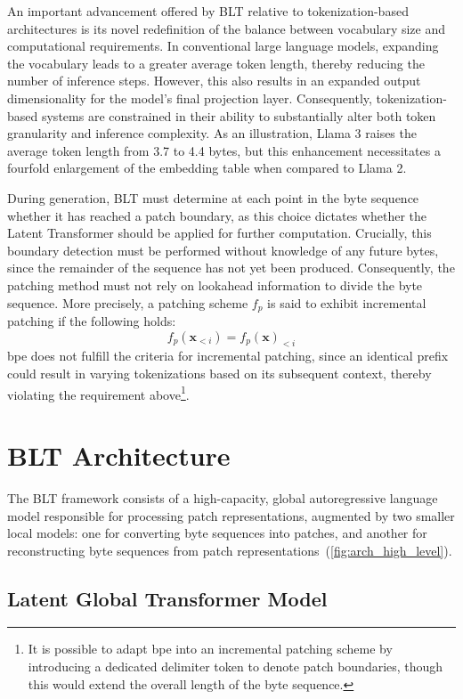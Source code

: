 An important advancement offered by {\textsc BLT} relative to tokenization-based architectures is its novel redefinition of the balance between vocabulary size and computational requirements. In conventional large language models, expanding the vocabulary leads to a greater average token length, thereby reducing the number of inference steps. However, this also results in an expanded output dimensionality for the model’s final projection layer. Consequently, tokenization-based systems are constrained in their ability to substantially alter both token granularity and inference complexity. As an illustration, Llama 3 raises the average token length from 3.7 to 4.4 bytes, but this enhancement necessitates a fourfold enlargement of the embedding table when compared to Llama 2.

During generation, {\textsc BLT} must determine at each point in the byte sequence whether it has reached a patch boundary, as this choice dictates whether the Latent Transformer should be applied for further computation. Crucially, this boundary detection must be performed without knowledge of any future bytes, since the remainder of the sequence has not yet been produced. Consequently, the patching method must not rely on lookahead information to divide the byte sequence. More precisely, a patching scheme $f_p$ is said to exhibit incremental patching if the following holds:
$$f_p(\pmb{x}_{<i}) = f_p(\pmb{x})_{<i}$$
bpe does not fulfill the criteria for incremental patching, since an identical prefix could result in varying tokenizations based on its subsequent context, thereby violating the requirement above\footnote{It is possible to adapt bpe into an incremental patching scheme by introducing a dedicated delimiter token to denote patch boundaries, though this would extend the overall length of the byte sequence.}.

\section{{\textsc BLT} Architecture}
\label{section:architecture}
The {\textsc BLT} framework consists of a high-capacity, global autoregressive language model responsible for processing patch representations, augmented by two smaller local models: one for converting byte sequences into patches, and another for reconstructing byte sequences from patch representations~(\autoref{fig:arch_high_level}).

\subsection{Latent Global Transformer Model}

